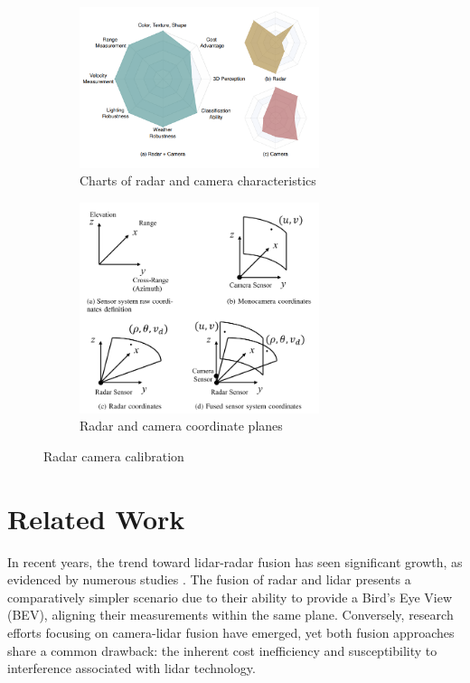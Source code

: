 \begin{figure}[hbpt]
    \centering
    \begin{subfigure}{0.3\linewidth}
        \includegraphics[width=7cm]{Figures/trade_off.png}
        \caption{Charts of radar and camera characteristics\cite{Yao_2023}}
        \label{subfig:trade_off_sub}
    \end{subfigure}
    \hspace{0.2\textwidth}
    \begin{subfigure}{0.3\linewidth}
        \includegraphics[width=7cm]{Figures/cam_radar_coordinates.png}
        \caption{Radar and camera coordinate planes\cite{8844649}}
        \label{subfig:cam_radar_sub}
    \end{subfigure}

    \caption{Radar camera calibration}
    \label{fig:trade_off_and_plane}
\end{figure}




\section{Related Work}\label{sec:1-related_work}
In recent years, the trend toward lidar-radar fusion has seen significant growth, as evidenced by numerous studies \cite{abs180711264}\cite{7579940}. 
The fusion of radar and lidar presents a comparatively simpler scenario due to their ability to provide a Bird's Eye View (BEV), 
aligning their measurements within the same plane. Conversely, research efforts focusing on camera-lidar fusion \cite{chen2017multiview}\cite{li2016vehicle} have emerged, 
yet both fusion approaches share a common drawback:
the inherent cost inefficiency and susceptibility to interference associated with lidar technology.

